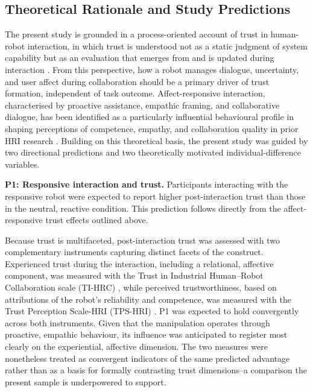 \documentclass[
  authoryear,
  doubleblind,
  3p]{elsarticle}
\newcounter{none} %
\begin{document}
\subsection{Theoretical Rationale and Study
Predictions}\label{theoretical-rationale-and-study-predictions}

The present study is grounded in a process-oriented account of trust in
human-robot interaction, in which trust is understood not as a static
judgment of system capability but as an evaluation that emerges from and
is updated during interaction \citep{lee2004, devisser2020}. From this
perspective, how a robot manages dialogue, uncertainty, and user affect
during collaboration should be a primary driver of trust formation,
independent of task outcome. Affect-responsive interaction,
characterised by proactive assistance, empathic framing, and
collaborative dialogue, has been identified as a particularly
influential behavioural profile in shaping perceptions of competence,
empathy, and collaboration quality in prior HRI research
\citep{birnbaum2016, shayganfar2019, fartook2025}. Building on this
theoretical basis, the present study was guided by two directional
predictions and two theoretically motivated individual-difference
variables.

\textbf{P1: Responsive interaction and trust.} Participants interacting
with the responsive robot were expected to report higher
post-interaction trust than those in the neutral, reactive condition.
This prediction follows directly from the affect-responsive trust
effects outlined above.

Because trust is multifaceted, post-interaction trust was assessed with
two complementary instruments capturing distinct facets of the
construct. Experienced trust during the interaction, including a
relational, affective component, was measured with the Trust in
Industrial Human--Robot Collaboration scale (TI-HRC)
\citep{charalambous2016}, while perceived trustworthiness, based on
attributions of the robot's reliability and competence, was measured
with the Trust Perception Scale-HRI (TPS-HRI) \citep{schaefer2016}. P1
was expected to hold convergently across both instruments. Given that
the manipulation operates through proactive, empathic behaviour, its
influence was anticipated to register most clearly on the experiential,
affective dimension. The two measures were nonetheless treated as
convergent indicators of the same predicted advantage rather than as a
basis for formally contrasting trust dimensions--a comparison the
present sample is underpowered to support.
\end{document}
